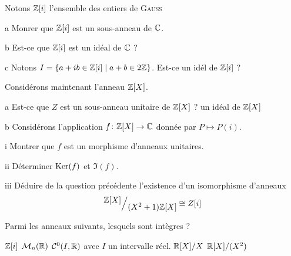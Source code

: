 \documentclass{report}
\begin{document}
\begin{exo}
    Notons \(\mathbb{Z}[i]\) l'ensemble des entiers de \textsc{Gauss}
    \begin{q}{1}
        \begin{q}{a}
            Monrer que \(\mathbb{Z}[i]\) est un sous-anneau de \(\mathbb{C}\).
        \end{q}
        \begin{q}{b}
            Est-ce que \(\mathbb{Z}[i]\) est un idéal de \(\mathbb{C}\) ?
        \end{q}
        \begin{q}{c}
            Notons \(I=\{a+ib\in\mathbb{Z}[i]\mid a+b\in2\mathbb{Z}\}\). Est-ce un idél de \(\mathbb{Z}[i]\) ?
        \end{q}
    \end{q}
    \begin{q}{2}
        Considérons maintenant l'anneau \(\mathbb{Z}[X]\).
        \begin{q}{a}
            Est-ce que \(Z\) est un sous-anneau unitaire de \(\mathbb{Z}[X]\) ?
            un idéal de \(\mathbb{Z}[X]\)
        \end{q}
        \begin{q}{b}
            Considérons l'application \(f\colon \mathbb{Z}[X]\to\mathbb{C}\) donnée par \(P\mapsto P(i)\).
            \begin{q}{i}
                Montrer que \(f\) est un morphisme d'anneaux unitaires.
            \end{q}
            \begin{q}{ii}
                Déterminer \(\operatorname{Ker}(f)\) et \(\Im(f)\).
            \end{q}
            \begin{q}{iii}
                Déduire de la question précédente l'existence d'un isomorphisme d'anneaux
                \[\quotient{\Z[X]}{(X^2+1)\Z[X]}\cong Z[i]\]
            \end{q}
        \end{q}
    \end{q}
\end{exo}

\begin{exo}
    Parmi les anneaux suivants, lesquels sont intègres ?
    \begin{enumerate}
        \itt \(\mathbb{Z}[i]\)
        \itt \(\mathcal{M}_n(\mathbb{R})\)
        \itt \(\mathcal{C}^0(I, \mathbb{R})\) avec \(I\) un intervalle réel.
        \itt \(\mathbb{R}[X]/X\)
        \itt \(\mathbb{R}[X]/(X^2)\)
    \end{enumerate}
\end{exo}
\end{document}
